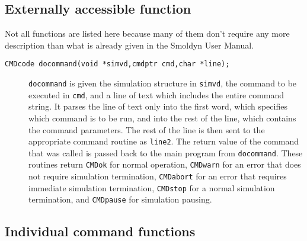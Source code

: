 \documentclass {scrbook}
\newcommand {\ttt} {\texttt}
\begin{document}
\subsection*{Externally accessible function}

Not all functions are listed here because many of them don't require any more description than what is already given in the Smoldyn User Manual.

\begin{description}

\item[\ttt{CMDcode docommand(void *simvd,cmdptr cmd,char *line);}]
\ttt{docommand} is given the simulation structure in \ttt{simvd}, the command to be executed in \ttt{cmd}, and a line of text which includes the entire command string. It parses the line of text only into the first word, which specifies which command is to be run, and into the rest of the line, which contains the command parameters. The rest of the line is then sent to the appropriate command routine as \ttt{line2}. The return value of the command that was called is passed back to the main program from \ttt{docommand}. These routines return \ttt{CMDok} for normal operation, \ttt{CMDwarn} for an error that does not require simulation termination, \ttt{CMDabort} for an error that requires immediate simulation termination, \ttt{CMDstop} for a normal simulation termination, and \ttt{CMDpause} for simulation pausing.

\end{description}

\subsection*{Individual command functions}
\end{document}
